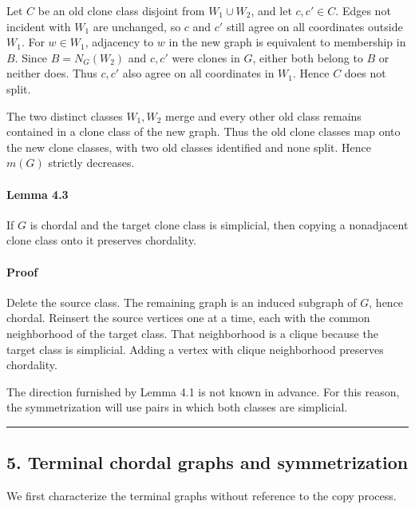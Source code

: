\documentclass[english,11pt,a4paper]{article}
\newcounter{none}
\begin{document}
Let \(C\) be an old clone class disjoint from \(W_1\cup W_2\), and let
\(c,c'\in C\). Edges not incident with \(W_1\) are unchanged, so \(c\)
and \(c'\) still agree on all coordinates outside \(W_1\). For
\(w\in W_1\), adjacency to \(w\) in the new graph is equivalent to
membership in \(B\). Since \(B=N_G(W_2)\) and \(c,c'\) were clones in
\(G\), either both belong to \(B\) or neither does. Thus \(c,c'\) also
agree on all coordinates in \(W_1\). Hence \(C\) does not split.

The two distinct classes \(W_1,W_2\) merge and every other old class
remains contained in a clone class of the new graph. Thus the old clone
classes map onto the new clone classes, with two old classes identified
and none split. Hence \(m(G)\) strictly decreases.

\paragraph{Lemma 4.3}\label{lemma-4.3}

If \(G\) is chordal and the target clone class is simplicial, then
copying a nonadjacent clone class onto it preserves chordality.

\paragraph{Proof}\label{proof-4}

Delete the source class. The remaining graph is an induced subgraph of
\(G\), hence chordal. Reinsert the source vertices one at a time, each
with the common neighborhood of the target class. That neighborhood is a
clique because the target class is simplicial. Adding a vertex with
clique neighborhood preserves chordality.

The direction furnished by Lemma 4.1 is not known in advance. For this
reason, the symmetrization will use pairs in which both classes are
simplicial.

\begin{center}\rule{0.5\linewidth}{0.5pt}\end{center}

\subsection{5. Terminal chordal graphs and
symmetrization}\label{terminal-chordal-graphs-and-symmetrization}

We first characterize the terminal graphs without reference to the copy
process.
\end{document}
